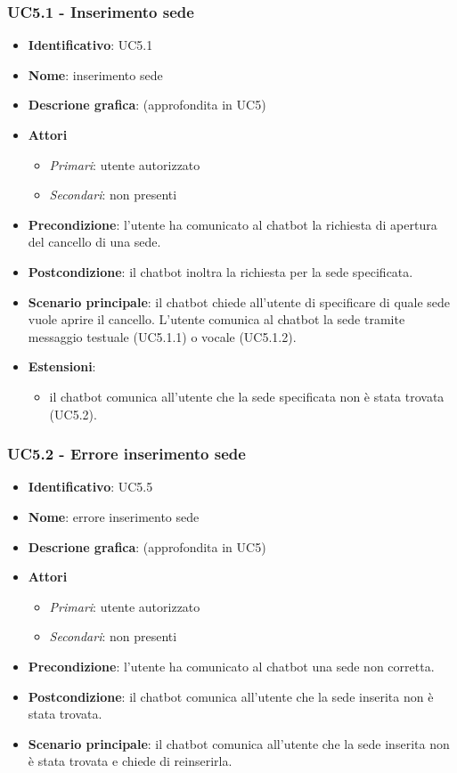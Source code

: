 \subsubsection{UC5.1 - Inserimento sede}
\begin{itemize}
    \item \textbf{Identificativo}: UC5.1
    \item \textbf{Nome}: inserimento sede
    \item \textbf{Descrione grafica}: (approfondita in UC5)
    \item \textbf{Attori}
 \begin{itemize} 
    \item \textit{Primari}: utente autorizzato 
    \item \textit{Secondari}: non presenti
 \end{itemize}
 \item \textbf{Precondizione}: l'utente ha comunicato al chatbot la richiesta di apertura del cancello di una sede.
 \item \textbf{Postcondizione}: il chatbot inoltra la richiesta per la sede specificata.
 \item \textbf{Scenario principale}: il chatbot chiede all'utente di specificare di quale sede vuole aprire il cancello. L'utente comunica al chatbot la sede tramite messaggio testuale (UC5.1.1) o vocale (UC5.1.2).
\item \textbf{Estensioni}: 
 \begin{itemize} 
    \item il chatbot comunica all'utente che la sede specificata non è stata trovata (UC5.2).
 \end{itemize}
\end{itemize}
\subsubsection{UC5.2 - Errore inserimento sede}
\begin{itemize}
    \item \textbf{Identificativo}: UC5.5
    \item \textbf{Nome}: errore inserimento sede
    \item \textbf{Descrione grafica}: (approfondita in UC5)
    \item \textbf{Attori}
 \begin{itemize} 
    \item \textit{Primari}: utente autorizzato 
    \item \textit{Secondari}: non presenti
 \end{itemize}
 \item \textbf{Precondizione}: l'utente ha comunicato al chatbot una sede non corretta.
 \item \textbf{Postcondizione}: il chatbot comunica all'utente che la sede inserita non è stata trovata.
 \item \textbf{Scenario principale}: il chatbot comunica all'utente che la sede inserita non è stata trovata e chiede di reinserirla.
\end{itemize}
\newpage